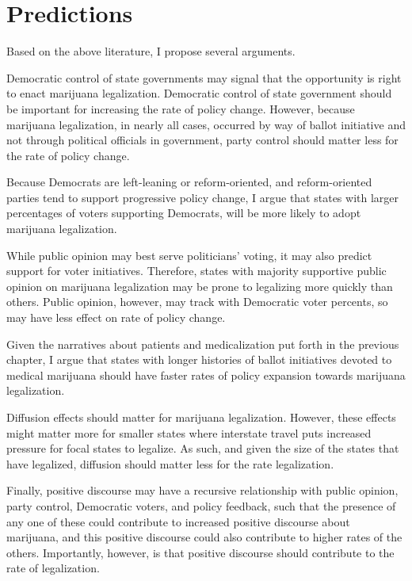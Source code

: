 \section{Predictions}

Based on the above literature, I propose several arguments. 

Democratic control of state governments may signal that the opportunity is right to enact marijuana legalization. Democratic control of state government should be important for increasing the rate of policy change. However, because marijuana legalization, in nearly all cases, occurred by way of ballot initiative and not through political officials in government, party control should matter less for the rate of policy change. 

Because Democrats are left-leaning or reform-oriented, and reform-oriented parties tend to support progressive policy change, I argue that states with larger percentages of voters supporting Democrats, will be more likely to adopt marijuana legalization.

While public opinion may best serve politicians' voting, it may also predict support for voter initiatives. Therefore, states with majority supportive public opinion on marijuana legalization may be prone to legalizing more quickly than others. Public opinion, however, may track with Democratic voter percents, so may have less effect on rate of policy change. 

Given the narratives about patients and medicalization put forth in the previous chapter, I argue that states with longer histories of ballot initiatives devoted to medical marijuana should have faster rates of policy expansion towards marijuana legalization. 

Diffusion effects should matter for marijuana legalization. However, these effects might matter more for smaller states where interstate travel puts increased pressure for focal states to legalize. As such, and given the size of the states that have legalized, diffusion should matter less for the rate legalization. 




Finally, positive discourse may have a recursive relationship with public opinion, party control, Democratic voters, and policy feedback, such that the presence of any one of these could contribute to increased positive discourse about marijuana, and this positive discourse could also contribute to higher rates of the others. Importantly, however, is that positive discourse should contribute to the rate of legalization. 



